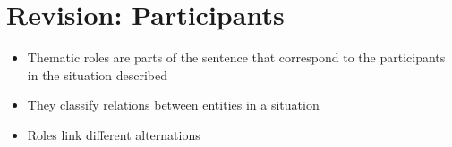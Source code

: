 \documentclass[headrule,footrule]{foils}
\begin{document}
\section{Revision: Participants}


\begin{itemize}
\item  Thematic roles are parts of the sentence that 
correspond to the participants in the situation 
described
\item  They classify relations between entities in a situation

\item  Roles link different alternations
\begin{exe}
  \ex {}
  \ex {}
\end{exe}
\end{itemize}
\end{document}
